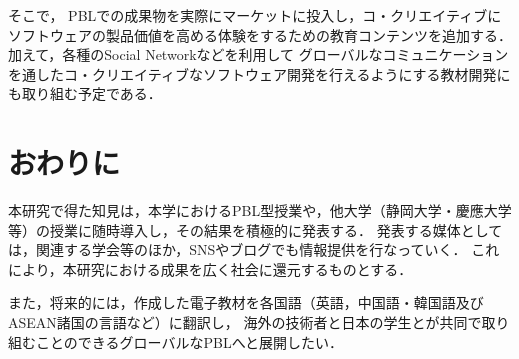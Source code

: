 \documentclass[a4j,9pt,twoside]{jarticle}
\begin{document}
\begin{multicols}{2}
	そこで，
	PBLでの成果物を実際にマーケットに投入し，コ・クリエイティブにソフトウェアの製品価値を高める体験をするための教育コンテンツを追加する．
	加えて，各種のSocial Networkなどを利用して
	グローバルなコミュニケーションを通したコ・クリエイティブなソフトウェア開発を行えるようにする教材開発にも取り組む予定である．

\section{おわりに}\label{sec:fin}
	本研究で得た知見は，本学におけるPBL型授業や，他大学（静岡大学・慶應大学等）の授業に随時導入し，その結果を積極的に発表する．
	発表する媒体としては，関連する学会等のほか，SNSやブログでも情報提供を行なっていく．
	これにより，本研究における成果を広く社会に還元するものとする．
	
	また，将来的には，作成した電子教材を各国語（英語，中国語・韓国語及びASEAN諸国の言語など）に翻訳し，
	海外の技術者と日本の学生とが共同で取り組むことのできるグローバルなPBLへと展開したい．


\end{multicols}
\end{document}
